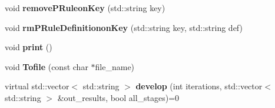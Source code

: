 \begin{DoxyCompactItemize}
\item 
\mbox{\label{class_l_sys_aa584da0586fff850dcffabb19b49f036}} 
void {\bfseries remove\+P\+Ruleon\+Key} (std\+::string key)
\item 
\mbox{\label{class_l_sys_adefa8538026807203b908b8c330572c7}} 
void {\bfseries rm\+P\+Rule\+Definitionon\+Key} (std\+::string key, std\+::string def)
\item 
\mbox{\label{class_l_sys_a9b0262453eb22c667bba6266bd646b3c}} 
void {\bfseries print} ()
\item 
\mbox{\label{class_l_sys_a5d8a3b562c02e7a1ca8afd9a9c7da50f}} 
void {\bfseries Tofile} (const char $\ast$file\+\_\+name)
\item 
\mbox{\label{class_l_sys_a6e5f0d6a695c702b1d0d12802fddacf8}} 
virtual std\+::vector$<$ std\+::string $>$ {\bfseries develop} (int iterations, std\+::vector$<$ std\+::string $>$ \&out\+\_\+results, bool all\+\_\+stages)=0
\end{DoxyCompactItemize}
